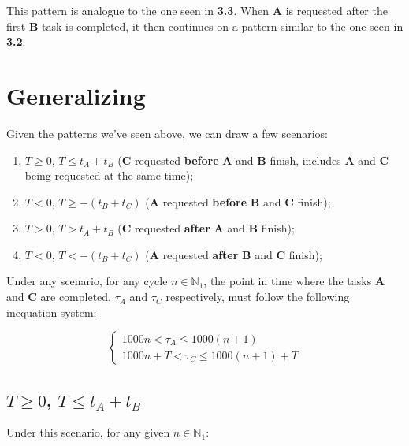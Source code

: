 \documentclass{article}
\begin{document}
This pattern is analogue to the one seen in \textbf{3.3}. When \textbf{A} is requested after the first \textbf{B} task is completed, it then continues on a pattern similar to the one seen in \textbf{3.2}.

\section{Generalizing}

Given the patterns we've seen above, we can draw a few scenarios:

\begin{enumerate}
    \item $T \ge 0$, $T \le t_A + t_B$ (\textbf{C} requested \textbf{before} \textbf{A} and \textbf{B} finish, includes \textbf{A} and \textbf{C} being requested at the same time);
    \item $T < 0$, $T \ge -(t_B + t_C)$ (\textbf{A} requested \textbf{before} \textbf{B} and \textbf{C} finish);
    \item $T > 0$, $T > t_A + t_B$ (\textbf{C} requested \textbf{after} \textbf{A} and \textbf{B} finish);
    \item $T < 0$, $T < -(t_B + t_C)$ (\textbf{A} requested \textbf{after} \textbf{B} and \textbf{C} finish);
\end{enumerate}

Under any scenario, for any cycle $n \in \mathbb{N}_1$, the point in time where the tasks \textbf{A} and \textbf{C} are completed, $\tau_A$ and $\tau_C$ respectively, must follow the following inequation system:

$$
\begin{cases}
    1000n < \tau_A \le 1000(n+1)\\
    1000n + T < \tau_C \le 1000(n+1) + T
\end{cases}
$$

\subsection{$T \ge 0$, $T \le t_A + t_B$}

Under this scenario, for any given $n \in \mathbb{N}_1$:
\end{document}
